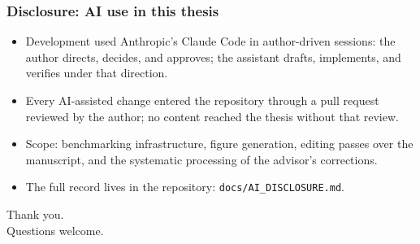 \documentclass[fleqn]{beamer}
\begin{document}
\begin{frame}
  \frametitle{Disclosure: AI use in this thesis}
  \begin{itemize}
    \item Development used Anthropic's Claude Code in author-driven sessions: the author directs, decides, and approves; the assistant drafts, implements, and verifies under that direction.
    \item Every AI-assisted change entered the repository through a pull request reviewed by the author; no content reached the thesis without that review.
    \item Scope: benchmarking infrastructure, figure generation, editing passes over the manuscript, and the systematic processing of the advisor's corrections.
    \item The full record lives in the repository: \texttt{docs/AI\_DISCLOSURE.md}.
  \end{itemize}
\end{frame}

\begin{frame}
  \begin{center}
    {\Large Thank you.} \\[4mm]
    Questions welcome.
  \end{center}
\end{frame}
\end{document}
